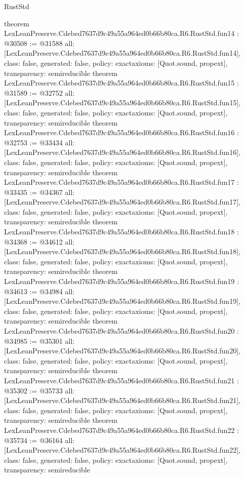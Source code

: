 \begin{lexlean}{RustStd}
\begin{coremodule}
{}
theorem LexLeanPreserve.Cdebed7637d9c49a55a964ed0b66b80ca.R6.RustStd.fun14 : @30508 := @31588 {
  all: [LexLeanPreserve.Cdebed7637d9c49a55a964ed0b66b80ca.R6.RustStd.fun14],
  class: false,
  generated: false,
  policy: exact{axioms: [Quot.sound, propext]},
  transparency: semireducible
}
theorem LexLeanPreserve.Cdebed7637d9c49a55a964ed0b66b80ca.R6.RustStd.fun15 : @31589 := @32752 {
  all: [LexLeanPreserve.Cdebed7637d9c49a55a964ed0b66b80ca.R6.RustStd.fun15],
  class: false,
  generated: false,
  policy: exact{axioms: [Quot.sound, propext]},
  transparency: semireducible
}
theorem LexLeanPreserve.Cdebed7637d9c49a55a964ed0b66b80ca.R6.RustStd.fun16 : @32753 := @33434 {
  all: [LexLeanPreserve.Cdebed7637d9c49a55a964ed0b66b80ca.R6.RustStd.fun16],
  class: false,
  generated: false,
  policy: exact{axioms: [Quot.sound, propext]},
  transparency: semireducible
}
theorem LexLeanPreserve.Cdebed7637d9c49a55a964ed0b66b80ca.R6.RustStd.fun17 : @33435 := @34367 {
  all: [LexLeanPreserve.Cdebed7637d9c49a55a964ed0b66b80ca.R6.RustStd.fun17],
  class: false,
  generated: false,
  policy: exact{axioms: [Quot.sound, propext]},
  transparency: semireducible
}
theorem LexLeanPreserve.Cdebed7637d9c49a55a964ed0b66b80ca.R6.RustStd.fun18 : @34368 := @34612 {
  all: [LexLeanPreserve.Cdebed7637d9c49a55a964ed0b66b80ca.R6.RustStd.fun18],
  class: false,
  generated: false,
  policy: exact{axioms: [Quot.sound, propext]},
  transparency: semireducible
}
theorem LexLeanPreserve.Cdebed7637d9c49a55a964ed0b66b80ca.R6.RustStd.fun19 : @34613 := @34984 {
  all: [LexLeanPreserve.Cdebed7637d9c49a55a964ed0b66b80ca.R6.RustStd.fun19],
  class: false,
  generated: false,
  policy: exact{axioms: [Quot.sound, propext]},
  transparency: semireducible
}
theorem LexLeanPreserve.Cdebed7637d9c49a55a964ed0b66b80ca.R6.RustStd.fun20 : @34985 := @35301 {
  all: [LexLeanPreserve.Cdebed7637d9c49a55a964ed0b66b80ca.R6.RustStd.fun20],
  class: false,
  generated: false,
  policy: exact{axioms: [Quot.sound, propext]},
  transparency: semireducible
}
theorem LexLeanPreserve.Cdebed7637d9c49a55a964ed0b66b80ca.R6.RustStd.fun21 : @35302 := @35733 {
  all: [LexLeanPreserve.Cdebed7637d9c49a55a964ed0b66b80ca.R6.RustStd.fun21],
  class: false,
  generated: false,
  policy: exact{axioms: [Quot.sound, propext]},
  transparency: semireducible
}
theorem LexLeanPreserve.Cdebed7637d9c49a55a964ed0b66b80ca.R6.RustStd.fun22 : @35734 := @36164 {
  all: [LexLeanPreserve.Cdebed7637d9c49a55a964ed0b66b80ca.R6.RustStd.fun22],
  class: false,
  generated: false,
  policy: exact{axioms: [Quot.sound, propext]},
  transparency: semireducible
}
\end{coremodule}
\end{lexlean}
